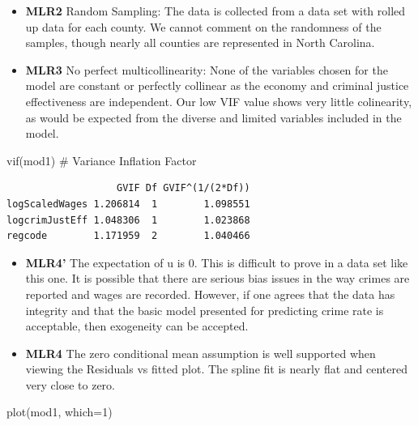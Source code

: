\documentclass[]{article}
\newenvironment{Shaded}{}{}
\newcommand{\CommentTok}[1]{\textcolor[rgb]{0.00,0.50,0.00}{#1}}
\newcommand{\DataTypeTok}[1]{#1}
\newcommand{\DecValTok}[1]{#1}
\newcommand{\KeywordTok}[1]{\textcolor[rgb]{0.00,0.00,1.00}{#1}}
\newcommand{\NormalTok}[1]{#1}
\begin{document}
\begin{itemize}
\item
  \textbf{MLR2} Random Sampling: The data is collected from a data set
  with rolled up data for each county. We cannot comment on the
  randomness of the samples, though nearly all counties are represented
  in North Carolina.
\item
  \textbf{MLR3} No perfect multicollinearity: None of the variables
  chosen for the model are constant or perfectly collinear as the
  economy and criminal justice effectiveness are independent. Our low
  VIF value shows very little colinearity, as would be expected from the
  diverse and limited variables included in the model.
\end{itemize}

\begin{Shaded}
\begin{Highlighting}[]
\KeywordTok{vif}\NormalTok{(mod1) }\CommentTok{# Variance Inflation Factor}
\end{Highlighting}
\end{Shaded}

\begin{verbatim}
                   GVIF Df GVIF^(1/(2*Df))
logScaledWages 1.206814  1        1.098551
logcrimJustEff 1.048306  1        1.023868
regcode        1.171959  2        1.040466
\end{verbatim}

\begin{itemize}
\item
  \textbf{MLR4'} The expectation of u is 0. This is difficult to prove
  in a data set like this one. It is possible that there are serious
  bias issues in the way crimes are reported and wages are recorded.
  However, if one agrees that the data has integrity and that the basic
  model presented for predicting crime rate is acceptable, then
  exogeneity can be accepted.
\item
  \textbf{MLR4} The zero conditional mean assumption is well supported
  when viewing the Residuals vs fitted plot. The spline fit is nearly
  flat and centered very close to zero.
\end{itemize}

\begin{Shaded}
\begin{Highlighting}[]
\KeywordTok{plot}\NormalTok{(mod1, }\DataTypeTok{which=}\DecValTok{1}\NormalTok{)}
\end{Highlighting}
\end{Shaded}
\end{document}
